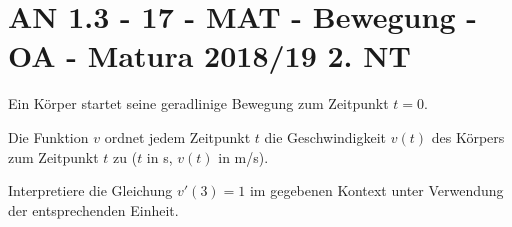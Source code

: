 \section{AN 1.3 - 17 - MAT - Bewegung - OA - Matura 2018/19 2. NT}

\begin{beispiel}[AN 1.3]{1}
Ein Körper startet seine geradlinige Bewegung zum Zeitpunkt $t=0$.

Die Funktion $v$ ordnet jedem Zeitpunkt $t$ die Geschwindigkeit $v(t)$ des Körpers zum Zeitpunkt $t$ zu ($t$ in s, $v(t)$ in m/s).

Interpretiere die Gleichung $v'(3)=1$ im gegebenen Kontext unter Verwendung der entsprechenden Einheit.

\end{beispiel}